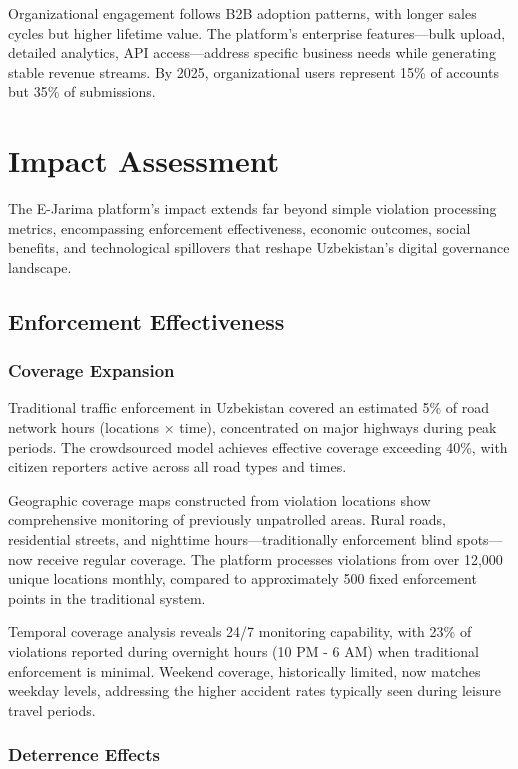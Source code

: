 \documentclass[pdflatex,sn-mathphys-num]{sn-jnl}%
\theoremstyle{thmstyleone}%
\theoremstyle{thmstyletwo}%
\theoremstyle{thmstylethree}%
\begin{document}
Organizational engagement follows B2B adoption patterns, with longer sales cycles but higher lifetime value. The platform's enterprise features—bulk upload, detailed analytics, API access—address specific business needs while generating stable revenue streams. By 2025, organizational users represent 15\% of accounts but 35\% of submissions.

\section{Impact Assessment}\label{sec5}

The E-Jarima platform's impact extends far beyond simple violation processing metrics, encompassing enforcement effectiveness, economic outcomes, social benefits, and technological spillovers that reshape Uzbekistan's digital governance landscape.

\subsection{Enforcement Effectiveness}\label{subsec16}

\subsubsection{Coverage Expansion}

Traditional traffic enforcement in Uzbekistan covered an estimated 5\% of road network hours (locations × time), concentrated on major highways during peak periods. The crowdsourced model achieves effective coverage exceeding 40\%, with citizen reporters active across all road types and times.

Geographic coverage maps constructed from violation locations show comprehensive monitoring of previously unpatrolled areas. Rural roads, residential streets, and nighttime hours—traditionally enforcement blind spots—now receive regular coverage. The platform processes violations from over 12,000 unique locations monthly, compared to approximately 500 fixed enforcement points in the traditional system.

Temporal coverage analysis reveals 24/7 monitoring capability, with 23\% of violations reported during overnight hours (10 PM - 6 AM) when traditional enforcement is minimal. Weekend coverage, historically limited, now matches weekday levels, addressing the higher accident rates typically seen during leisure travel periods.

\subsubsection{Deterrence Effects}
\end{document}
